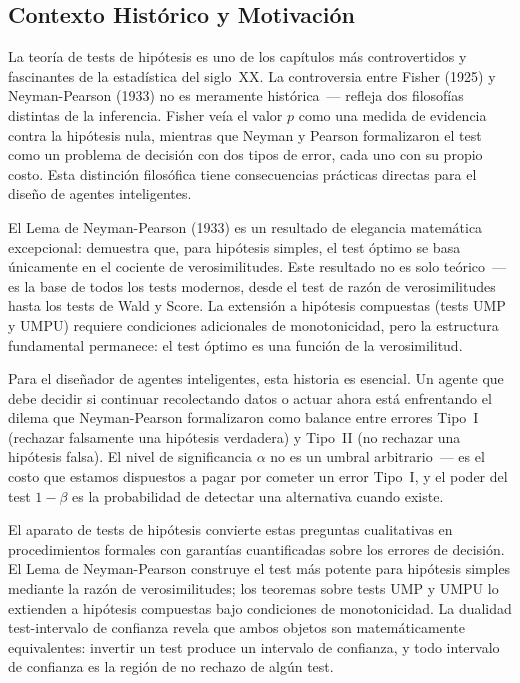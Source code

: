 \subsection*{Contexto Histórico y Motivación}

La teoría de tests de hipótesis es uno de los capítulos más controvertidos y fascinantes de la estadística del siglo~XX. La controversia entre Fisher (1925) y Neyman-Pearson (1933) no es meramente histórica~--- refleja dos filosofías distintas de la inferencia. Fisher veía el valor $p$ como una medida de evidencia contra la hipótesis nula, mientras que Neyman y Pearson formalizaron el test como un problema de decisión con dos tipos de error, cada uno con su propio costo. Esta distinción filosófica tiene consecuencias prácticas directas para el diseño de agentes inteligentes.

El Lema de Neyman-Pearson (1933) es un resultado de elegancia matemática excepcional: demuestra que, para hipótesis simples, el test óptimo se basa únicamente en el cociente de verosimilitudes. Este resultado no es solo teórico~--- es la base de todos los tests modernos, desde el test de razón de verosimilitudes hasta los tests de Wald y Score. La extensión a hipótesis compuestas (tests UMP y UMPU) requiere condiciones adicionales de monotonicidad, pero la estructura fundamental permanece: el test óptimo es una función de la verosimilitud.

Para el diseñador de agentes inteligentes, esta historia es esencial. Un agente que debe decidir si continuar recolectando datos o actuar ahora está enfrentando el dilema que Neyman-Pearson formalizaron como balance entre errores Tipo~I (rechazar falsamente una hipótesis verdadera) y Tipo~II (no rechazar una hipótesis falsa). El nivel de significancia $\alpha$ no es un umbral arbitrario~--- es el costo que estamos dispuestos a pagar por cometer un error Tipo~I, y el poder del test $1-\beta$ es la probabilidad de detectar una alternativa cuando existe.

El aparato de tests de hipótesis convierte estas preguntas cualitativas en procedimientos formales con garantías cuantificadas sobre los errores de decisión. El Lema de Neyman-Pearson construye el test más potente para hipótesis simples mediante la razón de verosimilitudes; los teoremas sobre tests UMP y UMPU lo extienden a hipótesis compuestas bajo condiciones de monotonicidad. La dualidad test-intervalo de confianza revela que ambos objetos son matemáticamente equivalentes: invertir un test produce un intervalo de confianza, y todo intervalo de confianza es la región de no rechazo de algún test.

